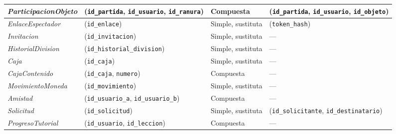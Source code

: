 \begin{center}
\begin{longtable}{|L{0.21\textwidth}|L{0.28\textwidth}|L{0.18\textwidth}|L{0.21\textwidth}|}
\textit{Participacion\-Objeto} & (\texttt{id\_\allowbreak{}partida}, \texttt{id\_\allowbreak{}usuario}, \texttt{id\_\allowbreak{}ranura}) & Compuesta & (\texttt{id\_\allowbreak{}partida}, \texttt{id\_\allowbreak{}usuario}, \texttt{id\_\allowbreak{}objeto}) \\ \hline
\textit{Enlace\-Espectador} & (\texttt{id\_\allowbreak{}enlace}) & Simple, sustituta & (\texttt{token\_\allowbreak{}hash}) \\ \hline
\textit{Invitacion} & (\texttt{id\_\allowbreak{}invitacion}) & Simple, sustituta & --- \\ \hline
\textit{Historial\-Division} & (\texttt{id\_\allowbreak{}historial\_\allowbreak{}division}) & Simple, sustituta & --- \\ \hline
\textit{Caja} & (\texttt{id\_\allowbreak{}caja}) & Simple, sustituta & --- \\ \hline
\textit{Caja\-Contenido} & (\texttt{id\_\allowbreak{}caja}, \texttt{numero}) & Compuesta & --- \\ \hline
\textit{Movimiento\-Moneda} & (\texttt{id\_\allowbreak{}movimiento}) & Simple, sustituta & --- \\ \hline
\textit{Amistad} & (\texttt{id\_\allowbreak{}usuario\_\allowbreak{}a}, \texttt{id\_\allowbreak{}usuario\_\allowbreak{}b}) & Compuesta & --- \\ \hline
\textit{Solicitud} & (\texttt{id\_\allowbreak{}solicitud}) & Simple, sustituta & (\texttt{id\_\allowbreak{}solicitante}, \texttt{id\_\allowbreak{}destinatario}) \\ \hline
\textit{Progreso\-Tutorial} & (\texttt{id\_\allowbreak{}usuario}, \texttt{id\_\allowbreak{}leccion}) & Compuesta & --- \\ \hline
\end{longtable}
\end{center}
